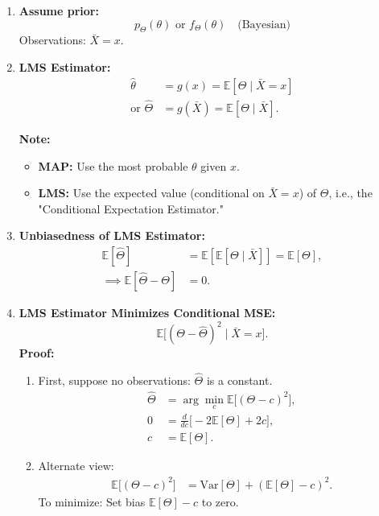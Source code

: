 
\begin{enumerate}
    \item \textbf{Assume prior:} 
    \[
    p_\Theta(\theta) \text{ or } f_\Theta(\theta) \quad \text{(Bayesian)}
    \]
    Observations: \( \bar{X} = x \).

    \item \textbf{LMS Estimator:}
    \begin{align*}
        \hat{\theta} &= g(x) = \mathbb{E}[\Theta \mid \bar{X} = x] \\
        \text{or } \hat{\Theta} &= g(\bar{X}) = \mathbb{E}[\Theta \mid \bar{X}].
    \end{align*}

    \textbf{Note:}
    \begin{itemize}
        \item \textbf{MAP:} Use the most probable \( \theta \) given \( x \).
        \item \textbf{LMS:} Use the expected value (conditional on \( \bar{X} = x \)) of \( \Theta \), i.e., the "Conditional Expectation Estimator."
    \end{itemize}

    \item \textbf{Unbiasedness of LMS Estimator:}
    \begin{align*}
        \mathbb{E}[\hat{\Theta}] &= \mathbb{E}[\mathbb{E}[\Theta \mid \bar{X}]] = \mathbb{E}[\Theta], \\
        \implies \mathbb{E}[\hat{\Theta} - \Theta] &= 0.
    \end{align*}

    \item \textbf{LMS Estimator Minimizes Conditional MSE:}
    \[
    \mathbb{E}\big[(\Theta - \hat{\Theta})^2 \mid \bar{X} = x \big].
    \]
    \textbf{Proof:}
    \begin{enumerate}
        \item First, suppose no observations: \( \hat{\Theta} \) is a constant.
        \begin{align*}
            \hat{\Theta} &= \arg\min_c \mathbb{E}\big[(\Theta - c)^2\big], \\
            0 &= \frac{d}{dc} \big[ -2\mathbb{E}[\Theta] + 2c \big], \\
            c &= \mathbb{E}[\Theta].
        \end{align*}

        \item Alternate view:
        \begin{align*}
            \mathbb{E}\big[(\Theta - c)^2\big] &= \mathrm{Var}[\Theta] + (\mathbb{E}[\Theta] - c)^2.
        \end{align*}
        To minimize: Set bias \( \mathbb{E}[\Theta] - c \) to zero.


\end{enumerate}
\end{enumerate}
